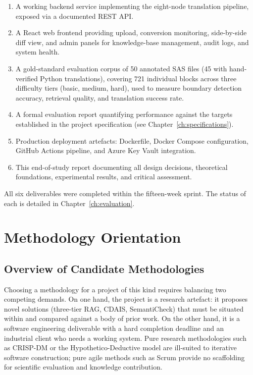 \begin{enumerate}
  \item A working backend service implementing the eight-node translation
    pipeline, exposed via a documented \ac{REST} \ac{API}.
  \item A React web frontend providing upload, conversion monitoring,
    side-by-side diff view, and admin panels for knowledge-base management,
    audit logs, and system health.
  \item A gold-standard evaluation corpus of 50 annotated SAS files
    (45 with hand-verified Python translations), covering 721 individual blocks
    across three difficulty tiers (basic, medium, hard), used to measure
    boundary detection accuracy, retrieval quality, and translation success
    rate.
  \item A formal evaluation report quantifying performance against the targets
    established in the project specification (see Chapter~\ref{ch:specifications}).
  \item Production deployment artefacts: Dockerfile, Docker Compose
    configuration, GitHub Actions pipeline, and Azure Key Vault integration.
  \item This end-of-study report documenting all design decisions, theoretical
    foundations, experimental results, and critical assessment.
\end{enumerate}

All six deliverables were completed within the fifteen-week sprint. The status
of each is detailed in Chapter~\ref{ch:evaluation}.

\section{Methodology Orientation}
\label{sec:methodology}

\subsection{Overview of Candidate Methodologies}
\label{subsec:methodologies-overview}

Choosing a methodology for a project of this kind requires balancing two
competing demands. On one hand, the project is a research artefact: it
proposes novel solutions (three-tier \ac{RAG}, \ac{CDAIS}, SemantiCheck) that
must be situated within and compared against a body of prior work. On the other
hand, it is a software engineering deliverable with a hard completion deadline
and an industrial client who needs a working system. Pure research methodologies
such as \ac{CRISP-DM} or the Hypothetico-Deductive model are ill-suited to
iterative software construction; pure agile methods such as Scrum provide no
scaffolding for scientific evaluation and knowledge contribution.

